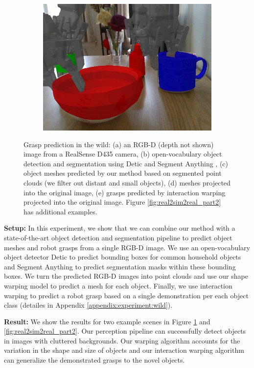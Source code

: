 \documentclass{article}
\begin{document}
\begin{figure}[]
\begin{subfigure}{(\linewidth - 0.05\linewidth)/5}
        \includegraphics[width=\linewidth]{figures/real2sim2real/5/4.png}
        \caption{}
    \end{subfigure}

    \caption{Grasp prediction in the wild: (a) an RGB-D (depth not shown) image from a RealSense D435 camera, (b) open-vocabulary object detection and segmentation using Detic \cite{zhou22detecting} and Segment Anything \cite{kirillov23segment}, (c) object meshes predicted by our method based on segmented point clouds (we filter out distant and small objects), (d) meshes projected into the original image, (e) grasps predicted by interaction warping projected into the original image. Figure \ref{fig:real2sim2real_part2} has additional examples.}
    \label{fig:real2sim2real}
\end{figure}

\textbf{Setup:} In this experiment, we show that we can combine our method with a state-of-the-art object detection and segmentation pipeline to predict object meshes and robot grasps from a single RGB-D image. We use an open-vocabulary object detector Detic \cite{zhou22detecting} to predict bounding boxes for common household objects and Segment Anything \cite{kirillov23segment} to predict segmentation masks within these bounding boxes. We turn the predicted RGB-D images into point clouds and use our shape warping model to predict a mesh for each object. Finally, we use interaction warping to predict a robot grasp based on a single demonstration per each object class (detailes in Appendix \ref{appendix:experiment:wild}).

\textbf{Result:} We show the results for two example scenes in Figure \ref{fig:real2sim2real} and \ref{fig:real2sim2real_part2}. Our perception pipeline can successfully detect objects in images with cluttered backgrounds. Our warping algorithm accounts for the variation in the shape and size of objects and our interaction warping algorithm can generalize the demonstrated grasps to the novel objects.
\end{document}
